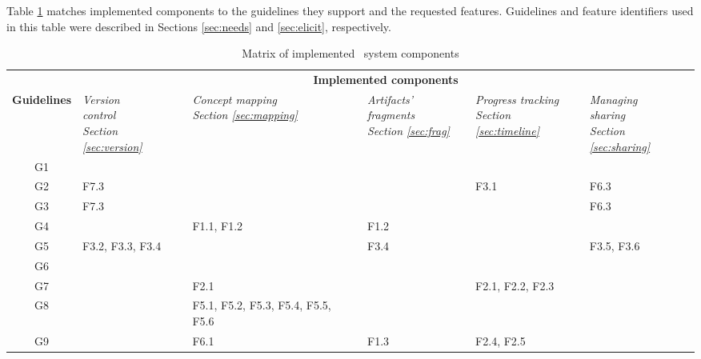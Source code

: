 Table \ref{tab:implement} matches implemented components to the guidelines they
support and the requested features. Guidelines and feature identifiers used in
this table were described in Sections \ref{sec:needs} and \ref{sec:elicit},
respectively.

\begin{table}[htb]
  \setlength{\abovecaptionskip}{0pt}
  \caption{Matrix of implemented \ep~system components}
  \begin{center} \small
    \begin{tabular}{| c || p{2cm} | p{2cm} | p{2cm} | p{2cm} | p{2cm} |}
    \hline
     \multicolumn{1}{|c||}{} &
     \multicolumn{5}{c|}{\textbf{Implemented components}} \\ \cline{2-6}
     \textbf{Guidelines} & 
     \textit{Version \newline control \newline Section \ref{sec:version}} & 
     \textit{Concept mapping \newline Section \ref{sec:mapping}} & 
     \textit{Artifacts' fragments \newline Section \ref{sec:frag}} & 
     \textit{Progress tracking \newline Section \ref{sec:timeline}} & 
     \textit{Managing \newline sharing \newline Section \ref{sec:sharing}} \\
     \hline \hline
     \rowcolor[gray]{.8} G1 & & & & & \\ \hline
     G2 & F7.3 & & & F3.1 & F6.3\\ \hline
     G3 & F7.3 & & & & F6.3 \\ \hline
     G4 & & F1.1, F1.2 & F1.2 & & \\ \hline
     G5 & F3.2, F3.3, \newline F3.4 & & F3.4 & & F3.5, F3.6 \\ \hline
     \rowcolor[gray]{.8} G6 & & & & & \\ \hline
     G7 & & F2.1 & & F2.1, F2.2, \newline F2.3 & \\ \hline
     G8 & & F5.1, F5.2, \newline F5.3, F5.4, \newline F5.5, F5.6 & & & \\ \hline
     G9 & & F6.1 & F1.3 & F2.4, F2.5 & \\ \hline
    \end{tabular}
  \end{center}
  \label{tab:implement}
\end{table}

